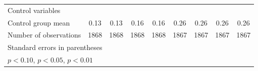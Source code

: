 {\begin{tabular}{l*{8}{c}}
Control variables   &                     &                     &                     &                     &                     &                     &                     &                     \\
Control group mean  &        0.13         &        0.13         &        0.16         &        0.16         &        0.26         &        0.26         &        0.26         &        0.26         \\
Number of observations&        1868         &        1868         &        1868         &        1868         &        1867         &        1867         &        1867         &        1867         \\
\hline\hline
\multicolumn{9}{l}{\footnotesize Standard errors in parentheses}\\
\multicolumn{9}{l}{\footnotesize \sym{*} \(p<0.10\), \sym{**} \(p<0.05\), \sym{***} \(p<0.01\)}\\
\end{tabular}
}
